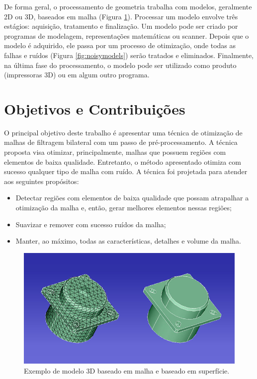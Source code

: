 De forma geral, o processamento de geometria trabalha com modelos, geralmente 2D ou 3D, baseados em malha (Figura \ref{fig:mshvsnonmsh}). Processar um modelo envolve três estágios: aquisição, tratamento e finalização. Um modelo pode ser criado por programas de modelagem, representações matemáticas ou scanner. Depois que o modelo é adquirido, ele passa por um processo de otimização, onde todas as falhas e ruídos (Figura \ref{fig:noisymodels}) serão tratados e eliminados. Finalmente, na última fase do processamento, o modelo pode ser utilizado como produto (impressoras 3D) ou em algum outro programa.

\section{Objetivos e Contribuições}

O principal objetivo deste trabalho é apresentar uma técnica de otimização de malhas de filtragem bilateral com um passo de pré-processamento. A técnica proposta visa otimizar, principalmente, malhas que possuem regiões com elementos de baixa qualidade. Entretanto, o método apresentado otimiza com sucesso qualquer tipo de malha com ruído. A técnica foi projetada para atender aos seguintes propósitos:

\begin{itemize}  
\item Detectar regiões com elementos de baixa qualidade que possam atrapalhar a otimização da malha e, então, gerar melhores elementos nessas regiões;
\item Suavizar e remover com sucesso ruídos da malha;
\item Manter, ao máximo, todas as características, detalhes e volume da malha.
\end{itemize}


\begin{figure}[!t]
\captionsetup{width=13cm}
\centering
\includegraphics[scale=0.55]{figuras/meshvsnonmesh.jpg}
\caption{Exemplo de modelo 3D baseado em malha e baseado em superfície.}
\label{fig:mshvsnonmsh}
\end{figure}



